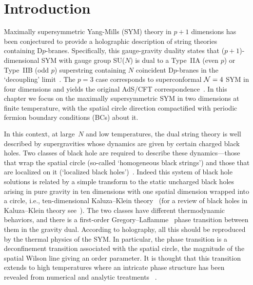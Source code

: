 \section{Introduction}
Maximally supersymmetric Yang-Mills (SYM) theory in $p + 1$ dimensions has been conjectured to provide a holographic description of string theories containing D$p$-branes.
Specifically, this gauge-gravity duality states that ($p + 1$)-dimensional SYM with gauge group SU($N$) is dual to a Type~IIA (even $p$) or Type~IIB (odd $p$) superstring containing $N$ coincident D$p$-branes in the `decoupling' limit~\cite{Itzhaki:1998dd, Aharony:1999ti}.
The $p = 3$ case corresponds to superconformal $\mathcal N = 4$ SYM in four dimensions and yields the original AdS/CFT correspondence~\cite{Maldacena:1997re}.
In this chapter we focus on the maximally supersymmetric SYM in two dimensions at finite temperature, with the spatial circle direction compactified with periodic fermion boundary conditions (BCs) about it.

In this context, at large~$N$ and low temperatures, the dual string theory is well described by supergravities whose dynamics are given by certain charged black holes.
Two classes of black hole are required to describe these dynamics---those that wrap the spatial circle (so-called `homogeneous black strings') and those that are localized on it (`localized black holes')~\cite{Susskind:1997dr, Barbon:1998cr, Li:1998jy, Martinec:1998ja, Aharony:2004ig, Aharony:2005ew}.
Indeed this system of black hole solutions is related by a simple transform to the static uncharged black holes arising in pure gravity in ten dimensions with one spatial dimension wrapped into a circle, i.e., ten-dimensional Kaluza--Klein theory~\cite{Aharony:2004ig, Harmark:2004ws} (for a review of black holes in Kaluza--Klein theory see~\cite{Horowitz:2011cq}).
The two classes have different thermodynamic behaviors, and there is a first-order Gregory--Laflamme~\cite{Gregory:1993vy} phase transition between them in the gravity dual.
According to holography, all this should be reproduced by the thermal physics of the SYM.
In particular, the phase transition is a deconfinement transition associated with the spatial circle, 
the magnitude of the spatial Wilson line giving an order parameter.
It is thought that this transition extends to high temperatures where an intricate phase structure has been revealed from numerical and analytic treatments ~\cite{Aharony:2004ig, Kawahara:2007fn, Mandal:2009vz}.

